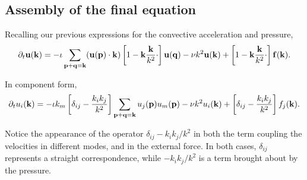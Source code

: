 \subsection{Assembly of the final equation}


Recalling our previous expressions for the convective acceleration and pressure,
\begin{equation*}
	\partial_t \mathbf{u} (\mathbf{k})  =
	- \iota  
	\sum_{ \mathbf{p} + \mathbf{q} = \mathbf{k}}
	(\mathbf{u}(\mathbf{p} ) \cdot \mathbf{k} )
	\left[ 
	1 - \mathbf{k} \frac{\mathbf{k} }{k^2} \cdot 
	\right]
	\mathbf{u}(\mathbf{q} )
	- \nu k^2 \mathbf{u}(\mathbf{k}) +
	\left[ 
	1 - \mathbf{k} \frac{\mathbf{k} }{k^2} \cdot 
	\right]
	\mathbf{f}(\mathbf{k}) .
\end{equation*}

In component form,
\begin{equation*}
	\partial_t u_i (\mathbf{k})  =
	- \iota  k_m
	\left[ 
	\delta_{ij} - \frac{k_i k_j  }{k^2}
	\right]
	\sum_{ \mathbf{p} + \mathbf{q} = \mathbf{k}}
	u_j(\mathbf{p} ) u_m(\mathbf{p} ) 
	- \nu k^2 u_i(\mathbf{k}) +
	\left[ 
	\delta_{ij} - \frac{k_i k_j }{k^2} 
	\right]
	f_j(\mathbf{k}) .
\end{equation*}

Notice the appearance of the operator \(  \delta_{ij} - k_i k_j  / k^2 \) in both the
term coupling the velocities in different modes, and in the external force. In both cases,
\(  \delta_{ij} \) represents a straight correspondence, while \(  - k_i k_j  / k^2 \)
is a term brought about by the pressure.

